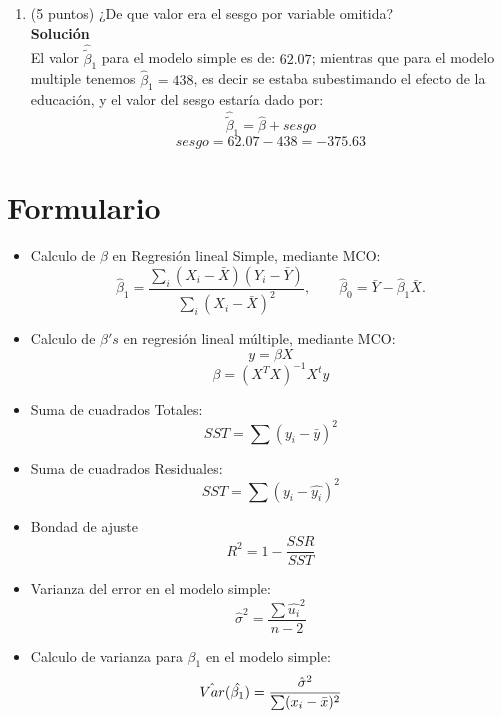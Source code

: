 \documentclass[10pt,a4paper]{article}
\begin{document}
\begin{enumerate}
\begin{enumerate}
\[\begin{aligned}
\end{aligned}
\]
El intercepto es 171, es decir el valor del salario promedio cuando la educación y la experiencia son igual a cero. El $\hat{\beta}_1$ es de 438, es decir el salario aumenta en promedio 438 unidades cuando la educación aumenta en 1 unidad, dejando la experiencia constante. El $\hat{\beta}_2$ es de 1070, lo que indica que el salario aumenta en promedio 1070 unidades cuando la experiencia aumenta en una unidad, dejando la educación constante.
    \item (5 puntos) ¿De que valor era el sesgo por variable omitida?
    \\
    \textbf{Solución}
    \\
El valor $\hat{\tilde{\beta}}_1$ para el modelo simple es de: $62.07$; mientras que para el modelo multiple tenemos $\hat{\beta}_1=438$, es decir se estaba subestimando el efecto de la educación, y el valor del sesgo estaría dado por:
$$\hat{\tilde{\beta}}_1 = \hat{\beta} + sesgo$$
$$sesgo = 62.07-438 = -375.63 $$

\end{enumerate}

\end{enumerate}

\newpage
\section{Formulario}
\begin{itemize}

\item Calculo de $\beta$ en Regresión lineal Simple, mediante MCO:
\[
\hat{\beta}_1=\frac{\sum_i (X_i-\bar{X})(Y_i-\bar{Y})}{\sum_i (X_i-\bar{X})^2},\qquad
\hat{\beta}_0=\bar{Y}-\hat{\beta}_1\bar{X}.
\]
\item Calculo de $\beta's$ en regresión lineal múltiple, mediante MCO:
$$y = \beta X$$
$$\beta = (X^TX)^{-1}X^ty$$


\item Suma de cuadrados Totales:
$$SST=\sum (y_i-\bar{y})^2$$

\item Suma de cuadrados Residuales:
$$SST=\sum (y_i-\hat{y_i})^2$$

\item Bondad de ajuste
$$R^2 = 1-\frac{SSR}{SST}$$

\item Varianza del error en el modelo simple:
$$\hat{\sigma}^2=\frac{\sum \hat{u_i}^2}{n-2}$$

\item Calculo de varianza para $\beta_1$ en el modelo simple:
$$\Hat{Var}(\hat{\beta_1})=\frac{\hat{\sigma}^2}{\sum (x_i-\bar{x})^2}$$

\end{itemize}
 
\end{document}

